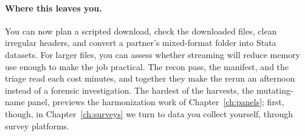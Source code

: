 \documentclass[
    a4paper,
    fontsize=10pt,
    twoside=true,
    numbers=noenddot,
]{kaobook}
\begin{document}
\paragraph{Where this leaves you.} You can now plan a scripted download, check the downloaded files, clean irregular headers, and convert a partner's mixed-format folder into Stata datasets. For larger files, you can assess whether streaming will reduce memory use enough to make the job practical. The recon pass, the manifest, and the triage read each cost minutes, and together they make the rerun an afternoon instead of a forensic investigation. The hardest of the harvests, the mutating-name panel, previews the harmonization work of Chapter~\ref{ch:panels}; first, though, in Chapter~\ref{ch:surveys} we turn to data you collect yourself, through survey platforms.
\end{document}
